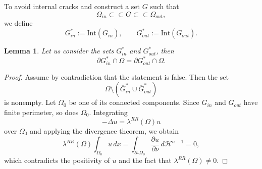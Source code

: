 \documentclass[oneside,a4paper,11pt,notitlepage]{article}
\theoremstyle{plain}
\numberwithin{teor}{section}
\numberwithin{equation}{section}
\theoremstyle{definition}
\theoremstyle{plain}
\newtheorem{lemma}[lemma]{Lemma}
\theoremstyle{plain}
\theoremstyle{plain}
\theoremstyle{plain}
\theoremstyle{definition}
\theoremstyle{definition}
\theoremstyle{plain}
\begin{document}
To avoid internal cracks and construct a set $G$ such that
\[
\Omega_{in} \subset\subset G \subset\subset \Omega_{out},
\]
we define
\[
G^\ast_{in} := \mathrm{Int}(\overline{G}_{in}),
\qquad
G^\ast_{out} := \mathrm{Int}(\overline{G}_{out}).
\]

\begin{lemma}\label{pgin=pgout}
Let us consider the sets $G^\ast_{in}$ and $G^\ast_{out}$, then 
\[
\partial G^\ast_{in} \cap \Omega = \partial G^\ast_{out} \cap \Omega.
\]
\end{lemma}

\begin{proof}
Assume by contradiction that the statement is false.
Then the set
\[
\Omega \setminus (\overline{G}^\ast_{in} \cup \overline{G}^\ast_{out})
\]
is nonempty.
Let $\Omega_0$ be one of its connected components.
Since $G_{in}$ and $G_{out}$ have finite perimeter, so does $\Omega_0$.
Integrating
\[
- \Delta u = \lambda^{RR}(\Omega) u
\]
over $\Omega_0$ and applying the divergence theorem, we obtain
\[
\lambda^{RR}(\Omega) \int_{\Omega_0} u \, dx
=
\int_{\partial_\ast \Omega_0} \frac{\partial u}{\partial \nu}
\, d\mathcal{H}^{n-1}
= 0,
\]
which contradicts the positivity of $u$ and the fact that $\lambda^{RR}(\Omega) \neq 0$.
\end{proof}
\end{document}
